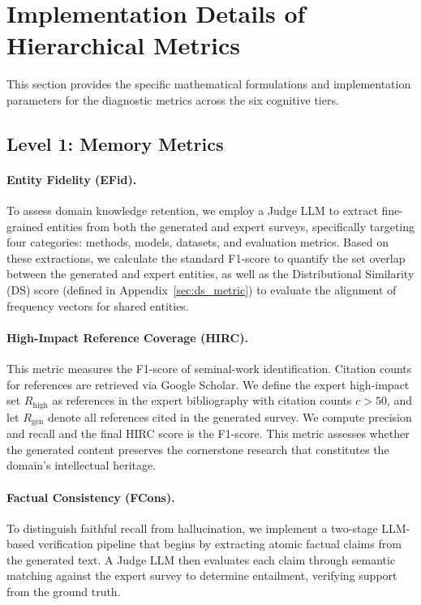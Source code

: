 \documentclass[11pt]{article}
\begin{document}
\section{Implementation Details of Hierarchical Metrics}
\label{sec:appendix_hm}

This section provides the specific mathematical formulations and implementation parameters for the diagnostic metrics across the six cognitive tiers.

\subsection{Level 1: Memory Metrics}

\paragraph{Entity Fidelity (EFid).}
To assess domain knowledge retention, we employ a Judge LLM to extract fine-grained entities from both the generated and expert surveys, specifically targeting four categories: methods, models, datasets, and evaluation metrics. Based on these extractions, we calculate the standard F1-score to quantify the set overlap between the generated and expert entities, as well as the Distributional Similarity (DS) score (defined in Appendix~\ref{sec:ds_metric}) to evaluate the alignment of frequency vectors for shared entities.

\paragraph{High-Impact Reference Coverage (HIRC).}
This metric measures the F1-score of seminal-work identification. Citation counts for references are retrieved via Google Scholar. We define the expert high-impact set $R_{\text{high}}$ as references in the expert bibliography with citation counts $c > 50$, and let $R_{\text{gen}}$ denote all references cited in the generated survey. We compute precision and recall and the final HIRC score is the F1-score. This metric assesses whether the generated content preserves the cornerstone research that constitutes the domain's intellectual heritage.

\paragraph{Factual Consistency (FCons).} To distinguish faithful recall from hallucination, we implement a two-stage LLM-based verification pipeline that begins by extracting atomic factual claims from the generated text. A Judge LLM then evaluates each claim through semantic matching against the expert survey to determine entailment, verifying support from the ground truth. 
\end{document}
